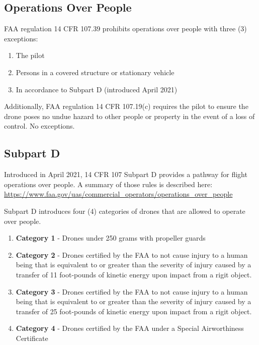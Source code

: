 \documentclass[
  12pt,
]{book}
\providecommand{\tightlist}{%
  \setlength{\itemsep}{0pt}\setlength{\parskip}{0pt}}
\begin{document}
\subsection{Operations Over People}\label{operations-over-people-1}

FAA regulation 14 CFR 107.39 prohibits operations over people with three (3) exceptions:

\begin{enumerate}
\def\labelenumi{\arabic{enumi}.}
\tightlist
\item
  The pilot
\item
  Persons in a covered structure or stationary vehicle
\item
  In accordance to Subpart D (introduced April 2021)
\end{enumerate}

Additionally, FAA regulation 14 CFR 107.19(c) requires the pilot to ensure the drone poses no undue hazard to other people or property in the event of a loss of control. No exceptions.

\subsection{Subpart D}\label{subpart-d}

Introduced in April 2021, 14 CFR 107 Subpart D provides a pathway for flight operations over people. A summary of those rules is described here: \url{https://www.faa.gov/uas/commercial_operators/operations_over_people}

Subpart D introduces four (4) categories of drones that are allowed to operate over people.

\begin{enumerate}
\def\labelenumi{\arabic{enumi}.}
\tightlist
\item
  \textbf{Category 1} - Drones under 250 grams with propeller guards
\item
  \textbf{Category 2} - Drones certified by the FAA to not cause injury to a human being that is equivalent to or greater than the severity of injury caused by a transfer of 11 foot-pounds of kinetic energy upon impact from a rigit object.
\item
  \textbf{Category 3} - Drones certified by the FAA to not cause injury to a human being that is equivalent to or greater than the severity of injury caused by a transfer of 25 foot-pounds of kinetic energy upon impact from a rigit object.
\item
  \textbf{Category 4} - Drones certified by the FAA under a Special Airworthiness Certificate
\end{enumerate}
\end{document}
